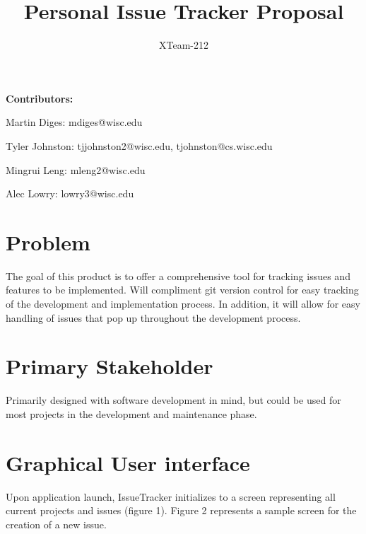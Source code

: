 \documentclass{article}
\title{Personal Issue Tracker Proposal}
\author{XTeam-212}
\begin{document}
\maketitle

\textbf{Contributors:}

Martin Diges: mdiges@wisc.edu

Tyler Johnston: tjjohnston2@wisc.edu, tjohnston@cs.wisc.edu

Mingrui Leng: mleng2@wisc.edu

Alec Lowry: lowry3@wisc.edu


\tableofcontents
\newpage

\section{Problem}

The goal of this product is to offer a comprehensive tool for tracking issues and features to be implemented.
Will compliment git version control for easy tracking of the development and implementation process.
In addition, it will allow for easy handling of issues that pop up throughout the development process.

\section{Primary Stakeholder}

Primarily designed with software development in mind, but could be used for most projects in the development and maintenance phase.

\section{Graphical User interface}

    Upon application launch, IssueTracker initializes to a screen representing all current projects and issues (figure 1). Figure 2 represents a sample screen for the creation of a new issue.
\end{document}
